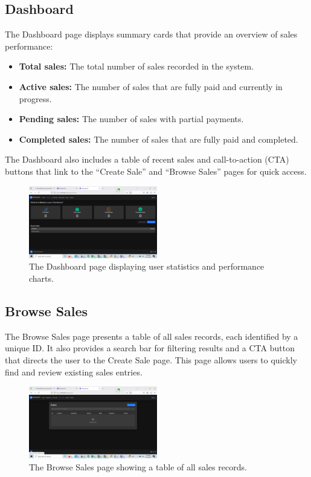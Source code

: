 \documentclass[12pt]{article}
\begin{document}
\subsection{Dashboard}
The Dashboard page displays summary cards that provide an overview of sales performance:
\begin{itemize}
    \item \textbf{Total sales:} The total number of sales recorded in the system.
    \item \textbf{Active sales:} The number of sales that are fully paid and currently in progress.
    \item \textbf{Pending sales:} The number of sales with partial payments.
    \item \textbf{Completed sales:} The number of sales that are fully paid and completed.
\end{itemize}
The Dashboard also includes a table of recent sales and call-to-action (CTA) buttons that link to the ``Create Sale'' and ``Browse Sales'' pages for quick access.
\begin{figure}[H]
    \centering
    \includegraphics[width=0.5\textwidth]{dashboard.png}
    \caption{The Dashboard page displaying user statistics and performance charts.}
\end{figure}

\subsection{Browse Sales}
The Browse Sales page presents a table of all sales records, each identified by a unique ID. It also provides a search bar for filtering results and a CTA button that directs the user to the Create Sale page. This page allows users to quickly find and review existing sales entries.
\begin{figure}[H]
    \centering
    \includegraphics[width=0.5\textwidth]{browse_sales.png}
    \caption{The Browse Sales page showing a table of all sales records.}
\end{figure}
\end{document}
